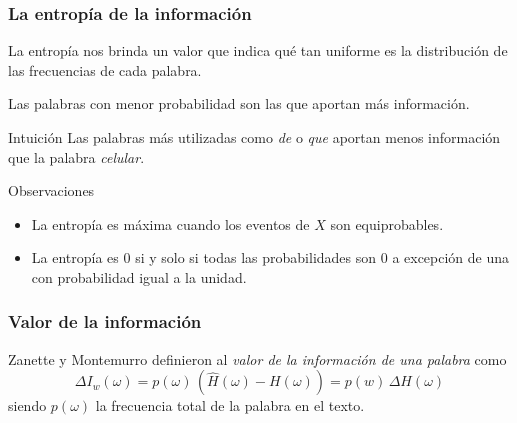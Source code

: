 \begin{frame}[t]\frametitle{La entropía de la información}
    
La entropía nos brinda un valor que indica qué tan uniforme es la distribución de las frecuencias de cada palabra. 

Las palabras con menor probabilidad son las que aportan más información. 

\begin{block}{Intuición} Las palabras más utilizadas como \textit{de} o \textit{que} aportan menos información que la palabra \textit{celular}. 
\end{block}

\begin{block}{Observaciones}
    \begin{itemize}
        \item La entropía es máxima cuando los eventos de $X$ son equiprobables.%
        \item La entropía es 0 si y solo si todas las probabilidades son 0 a excepción de una con probabilidad igual a la unidad. 
    \end{itemize}

\end{block}

\end{frame}

\begin{frame}[t]\frametitle{Valor de la información}
    Zanette y Montemurro definieron al \textit{valor de la información de una palabra} como
 \begin{equation}
  \Delta I_w(\omega) = p(\omega) \,  (\widehat{H}(\omega) - H(\omega))  =  p(w) \, \Delta{H(\omega)}
 \end{equation}
siendo $p(\omega)$ la frecuencia total de la palabra en el texto.


\end{frame}

